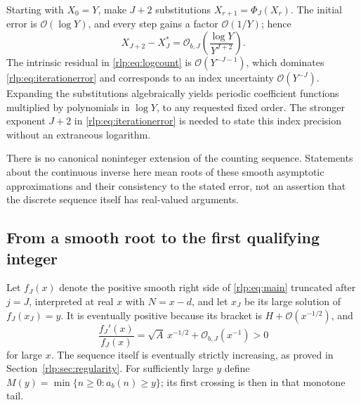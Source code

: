 \documentclass[11pt,letterpaper]{article}
\numberwithin{equation}{section}
\theoremstyle{remark}\newtheorem{remark}[theorem]{Remark}
\newcommand{\Ord}{\mathcal O}
\begin{document}
Starting with $X_0=Y$, make $J+2$ substitutions $X_{r+1}=\Phi_J(X_r)$. The initial error is $\Ord(\log Y)$, and every step gains a factor $\Ord(1/Y)$; hence
\begin{equation}\label{rlp:eq:iterationerror}
 X_{J+2}-X_J^*=\Ord_{b,J}\left(\frac{\log Y}{Y^{J+2}}\right).
\end{equation}
The intrinsic residual in \eqref{rlp:eq:logcount} is $\Ord(Y^{-J-1})$, which dominates \eqref{rlp:eq:iterationerror} and corresponds to an index uncertainty $\Ord(Y^{-J})$. Expanding the substitutions algebraically yields periodic coefficient functions multiplied by polynomials in $\log Y$, to any requested fixed order. The stronger exponent $J+2$ in \eqref{rlp:eq:iterationerror} is needed to state this index precision without an extraneous logarithm.

There is no canonical noninteger extension of the counting sequence. Statements about the continuous inverse here mean roots of these smooth asymptotic approximations and their consistency to the stated error, not an assertion that the discrete sequence itself has real-valued arguments.

\subsection{From a smooth root to the first qualifying integer}
Let $f_J(x)$ denote the positive smooth right side of \eqref{rlp:eq:main} truncated after $j=J$, interpreted at real $x$ with $N=x-d$, and let $x_J$ be its large solution of $f_J(x_J)=y$. It is eventually positive because its bracket is $H+\Ord(x^{-1/2})$, and
\begin{equation}\label{rlp:eq:smoothderivative}
 \frac{f_J'(x)}{f_J(x)}=\sqrt A\,x^{-1/2}+\Ord_{b,J}(x^{-1})>0
\end{equation}
for large $x$. The sequence itself is eventually strictly increasing, as proved in Section~\ref{rlp:sec:regularity}. For sufficiently large $y$ define $M(y)=\min\{n\ge0:a_b(n)\ge y\}$; its first crossing is then in that monotone tail.
\end{document}
